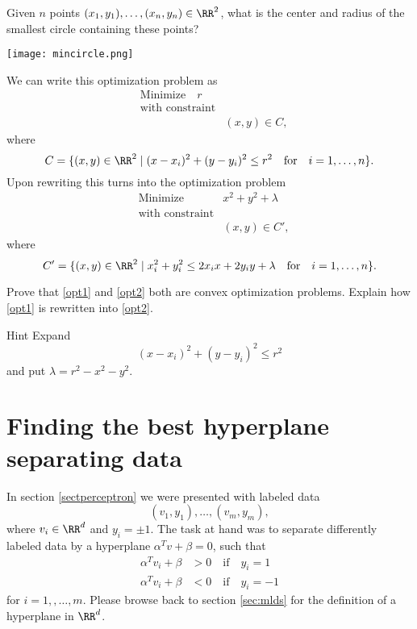 \documentclass{article}
\begin{document}
  \begin{example}\label{enclcircle}
    Given $n$ points
$(x_1, y_1), \dots, (x_n, y_n)\in \RR^2$, what is the center and
radius of the smallest circle containing these points?

\texttt{[image: mincircle.png]}

We can write this optimization problem as
    \begin{align}\label{opt1}
    &\text{Minimize}\quad r\\
    &\text{with constraint}\\
    &&(x, y)\in C,
    \end{align}
    where
    $$
    C = \{(x, y)\in \RR^2 \mid (x - x_i)^2 + (y- y_i)^2 \leq r^2\quad\text{for}\quad i = 1, \dots, n\}.
    $$
    Upon rewriting this turns into the optimization problem
    \begin{align}\label{opt2}
    &\text{Minimize} &x^2 + y^2 + \lambda\\
    &\text{with constraint}\\
    &&(x, y)\in C',
    \end{align}
    where
    $$
    C' = \{(x, y)\in \RR^2 \mid x_i^2 + y_i^2 \leq 2 x_i x + 2 y_i y + \lambda\quad \text{for}\quad i = 1, \dots, n\}.
    $$
  \end{example}
  
  \beginshex
  Prove that \eqref{opt1} and \eqref{opt2} both are convex optimization problems.
  Explain how \eqref{opt1} is rewritten into \eqref{opt2}.

  \begin{hideinbutton}{Hint}
    Expand
    $$
    (x - x_i)^2 + (y- y_i)^2 \leq r^2
    $$
    and put $\lambda = r^2-x^2-y^2$.
  \end{hideinbutton}
  \endshex
  

  
  \section{Finding the best hyperplane separating data}

  In section \ref{sectperceptron} we were
  presented with labeled data
  \begin{equation}\label{sepdata}
  (v_1, y_1), \dots, (v_m, y_m),
  \end{equation}
  where $v_i\in \RR^d$ and $y_i = \pm 1$. The task at hand was to separate differently
  labeled data by a hyperplane $\alpha^T v + \beta = 0$, such that
  \begin{align}\label{psep}
    \alpha^T v_i + \beta &> 0\quad\text{if}\quad y_i = 1\\
    \alpha^T v_i + \beta &< 0\quad\text{if}\quad y_i = -1
  \end{align}
  for $i = 1, ,\dots, m$. 
Please browse back to section \ref{sec:mlds} for the definition of a hyperplane in $\RR^d$.
\end{document}
